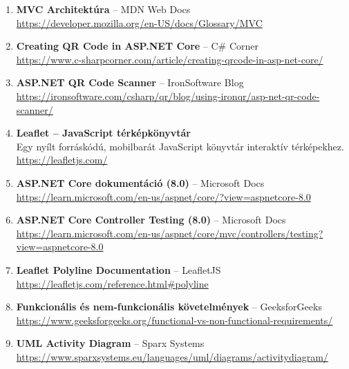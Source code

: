 \begin{enumerate}
    \item \label{ref:mvc_architektura} \textbf{MVC Architektúra} – MDN Web Docs\\
    \url{https://developer.mozilla.org/en-US/docs/Glossary/MVC}

    \item \label{ref:qr_code} \textbf{Creating QR Code in ASP.NET Core} – C\# Corner\\
    \url{https://www.c-sharpcorner.com/article/creating-qrcode-in-asp-net-core/}

    \item \label{ref:qr_scanner} \textbf{ASP.NET QR Code Scanner} – IronSoftware Blog\\
    \url{https://ironsoftware.com/csharp/qr/blog/using-ironqr/asp-net-qr-code-scanner/}

    \item \label{ref:leaflet} \textbf{Leaflet – JavaScript térképkönyvtár}\\
    Egy nyílt forráskódú, mobilbarát JavaScript könyvtár interaktív térképekhez.\\
    \url{https://leafletjs.com/}

    \item \label{ref:aspnet_core_docs} \textbf{ASP.NET Core dokumentáció (8.0)} – Microsoft Docs\\
    \url{https://learn.microsoft.com/en-us/aspnet/core/?view=aspnetcore-8.0}

    \item \label{ref:controller_testing} \textbf{ASP.NET Core Controller Testing (8.0)} – Microsoft Docs\\
    \url{https://learn.microsoft.com/en-us/aspnet/core/mvc/controllers/testing?view=aspnetcore-8.0}
    
    \item \label{ref:leaflet_polyline_docs} \textbf{Leaflet Polyline Documentation} – LeafletJS\\
    \url{https://leafletjs.com/reference.html#polyline}
    
    \item \label{ref:func_vs_nonfunc} \textbf{Funkcionális és nem-funkcionális követelmények} – GeeksforGeeks\\
    \url{https://www.geeksforgeeks.org/functional-vs-non-functional-requirements/}

    \item \label{ref:uml_activity} \textbf{UML Activity Diagram} – Sparx Systems\\
    \url{https://www.sparxsystems.eu/languages/uml/diagrams/activitydiagram/}

\end{enumerate}
